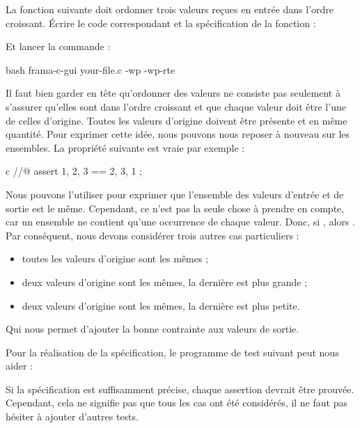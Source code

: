 

La fonction suivante doit ordonner trois valeurs reçues en entrée dans
l'ordre croissant. Écrire le code correspondant et la spécification de la
fonction :



Et lancer la commande :


\begin{CodeBlock}{bash}
frama-c-gui your-file.c -wp -wp-rte
\end{CodeBlock}


Il faut bien garder en tête qu'ordonner des valeurs ne consiste pas seulement
à s'assurer qu'elles sont dans l'ordre croissant et que chaque valeur doit
être l'une de celles d'origine. Toutes les valeurs d'origine doivent être
présente et en même quantité. Pour exprimer cette idée, nous pouvons nous
reposer à nouveau sur les ensembles. La propriété suivante est vraie par
exemple :


\begin{CodeBlock}{c}
//@ assert { 1, 2, 3 } == { 2, 3, 1 };
\end{CodeBlock}


Nous pouvons l'utiliser pour exprimer que l'ensemble des valeurs d'entrée et
de sortie est le même. Cependant, ce n'est pas la seule chose à prendre en
compte, car un ensemble ne contient qu'une occurrence de chaque valeur. Donc,
si , alors .
Par conséquent, nous devons considérer trois autres cas particuliers :
\begin{itemize}
\item toutes les valeurs d'origine sont les mêmes ;
\item deux valeurs d'origine sont les mêmes, la dernière est plus grande ;
\item deux valeurs d'origine sont les mêmes, la dernière est plus petite.
\end{itemize}


Qui nous permet d'ajouter la bonne contrainte aux valeurs de sortie.


Pour la réalisation de la spécification, le programme de test suivant peut
nous aider :




Si la spécification est suffisamment précise, chaque assertion devrait être
prouvée. Cependant, cela ne signifie pas que tous les cas ont été considérés,
il ne faut pas hésiter à ajouter d'autres tests.
